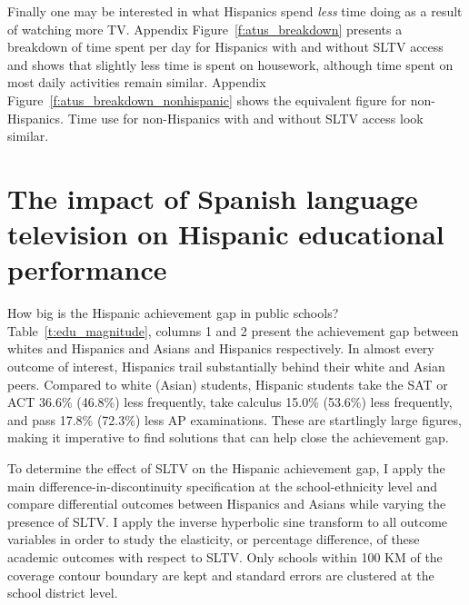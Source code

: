 \documentclass[11pt]{article}
\begin{document}
Finally one may be interested in what Hispanics spend \textit{less} time doing as a result of watching more TV. Appendix Figure~\ref{f:atus_breakdown} presents a breakdown of time spent per day for Hispanics with and without SLTV access and shows that slightly less time is spent on housework, although time spent on most daily activities remain similar. Appendix Figure~\ref{f:atus_breakdown_nonhispanic} shows the equivalent figure for non-Hispanics. Time use for non-Hispanics with and without SLTV access look similar. 




\section{The impact of Spanish language television on Hispanic educational performance}\label{s:school}

How big is the Hispanic achievement gap in public schools? Table~\ref{t:edu_magnitude}, columns 1 and 2 present the achievement gap between whites and Hispanics and Asians and Hispanics respectively. In almost every outcome of interest, Hispanics trail substantially behind their white and Asian peers. Compared to white (Asian) students, Hispanic students take the SAT or ACT 36.6\% (46.8\%) less frequently, take calculus 15.0\% (53.6\%) less frequently, and pass 17.8\% (72.3\%) less AP examinations. These are startlingly large figures, making it imperative to find solutions that can help close the achievement gap.

To determine the effect of SLTV on the Hispanic achievement gap, I apply the main difference-in-discontinuity specification at the school-ethnicity level and compare differential outcomes between Hispanics and Asians while varying the presence of SLTV. I apply the inverse hyperbolic sine transform to all outcome variables in order to study the elasticity, or percentage difference, of these academic outcomes with respect to SLTV. Only schools within 100 KM of the coverage contour boundary are kept and standard errors are clustered at the school district level. 
 
\end{document}
